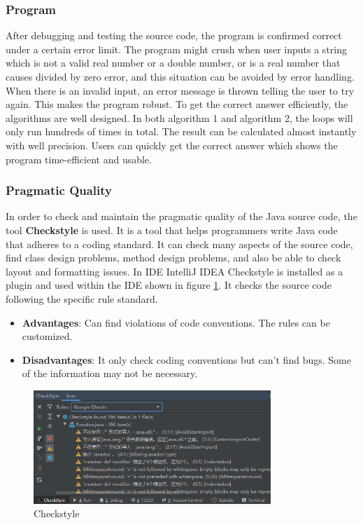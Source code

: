 \documentclass{article}
\begin{document}
\subsubsection{Program}
After debugging and testing the source code, the program is confirmed correct under a certain error limit. The program might crush when user inputs a string which is not a valid real number or a double number, or is a real number that causes divided by zero error, and this situation can be avoided by error handling. When there is an invalid input, an error message is thrown telling the user to try again. This makes the program robust. To get the correct answer efficiently, the algorithms are well designed. In both algorithm 1 and algorithm 2, the loops will only run hundreds of times in total. The result can be calculated almost instantly with well precision. Users can quickly get the correct answer which shows the program time-efficient and usable.\newline

\subsubsection{Pragmatic Quality}
In order to check and maintain the pragmatic quality of the Java source code, the tool \textbf{Checkstyle} is used. It is a tool that helps programmers write Java code that adheres to a coding standard. It can check many aspects of the source code, find class design problems, method design problems, and also be able to check layout and formatting issues. In IDE IntelliJ IDEA Checkstyle is installed as a plugin and used within the IDE shown in figure \ref{Fig.checkstyle}. It checks the source code following the specific rule standard.
\begin{itemize}
    \item \textbf{Advantages}: Can find violations of code conventions. The rules can be customized.
    \item \textbf{Disadvantages}: It only check coding conventions but can't find bugs. Some of the information may not be necessary.
\end{itemize}
\begin{figure}[H]
\centering
\includegraphics[width=0.8\textwidth]{checkstyleshot.png}
\caption{Checkstyle}
\label{Fig.checkstyle}
\end{figure}
\end{document}

